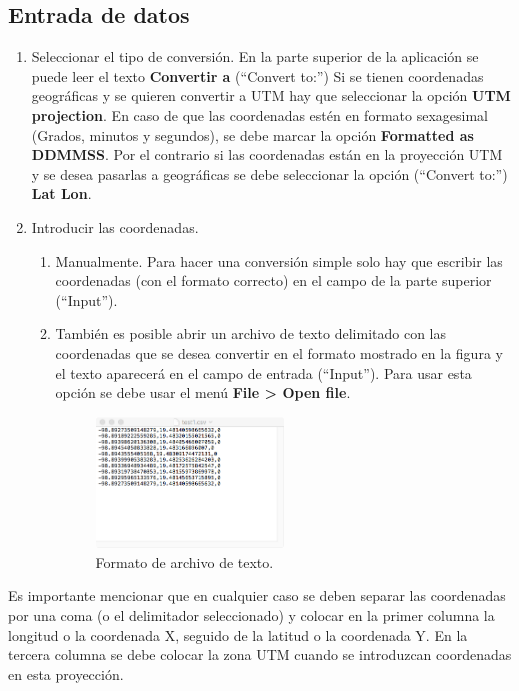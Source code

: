 \documentclass[12pt, letterpaper]{article}
\begin{document}
\subsection{Entrada de datos}

\begin{enumerate}
\item Seleccionar el tipo de conversión. En la parte superior de la aplicación se puede leer el texto \textbf{Convertir a} (``Convert to:'') Si se tienen coordenadas geográficas y se quieren convertir a UTM hay que seleccionar la opción \textbf{UTM projection}. En caso de que las coordenadas estén en formato sexagesimal (Grados, minutos y segundos), se debe marcar la opción \textbf{Formatted as DDMMSS}. Por el contrario si las coordenadas están en la proyección UTM y se desea pasarlas a geográficas se debe seleccionar la opción (``Convert to:'') \textbf{Lat Lon}.

\item Introducir las coordenadas.
	\begin{enumerate}
	\item Manualmente. Para hacer una conversión simple solo hay que escribir las coordenadas (con el formato correcto) en el campo de la parte superior (``Input'').
	\item También es posible abrir un archivo de texto delimitado con las coordenadas que se desea convertir en el formato mostrado en la figura y el texto aparecerá en el campo de entrada (``Input''). Para usar esta opción se debe usar el menú \textbf{File > Open file}.
	
	\begin{figure}[h]
	    \centering
	    \includegraphics[width=0.5\textwidth]{img/textfile.png}
	    \caption{Formato de archivo de texto.}
	    \label{fig:textfile}
	\end{figure}
	
	\end{enumerate}
\end{enumerate}

Es importante mencionar que en cualquier caso se deben separar las coordenadas por una coma (o el delimitador seleccionado) y colocar en la primer columna la longitud o la coordenada X, seguido de la latitud o la coordenada Y. En la tercera columna se debe colocar la zona UTM cuando se introduzcan coordenadas en esta proyección.
\end{document}
